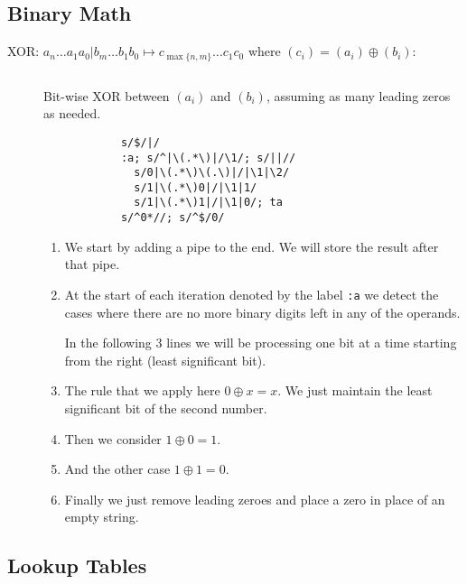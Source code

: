 \subsection{Binary Math}

\begin{description}
	\item[XOR: $a_n\ldots a_1 a_0\texttt{|}b_m\ldots b_1 b_0 \mapsto
		c_{\max\{n, m\}}\ldots c_1 c_0$ where $(c_i)=(a_i)\oplus(b_i)$:]$\,$

		Bit-wise XOR between $(a_i)$ and $(b_i)$, assuming as many leading zeros
		as needed.

		\begin{Verbatim}
			s/$/|/
			:a; s/^|\(.*\)|/\1/; s/||//
			  s/0|\(.*\)\(.\)|/|\1|\2/
			  s/1|\(.*\)0|/|\1|1/
			  s/1|\(.*\)1|/|\1|0/; ta
			s/^0*//; s/^$/0/
		\end{Verbatim}

		\begin{enumerate}
			\item We start by adding a pipe to the end.
				We will store the result after that pipe.
			\item At the start of each iteration denoted by the label \verb|:a| we
				detect the cases where there are no more binary digits left in any
				of the operands.

				In the following 3 lines we will be processing
				one bit at a time starting from the right (least significant bit).
			\item The rule that we apply here $0\oplus x = x$.  We just maintain the
				least significant bit of the second number.
			\item Then we consider $1\oplus 0=1$.
			\item And the other case $1\oplus 1=0$.
			\item Finally we just remove leading zeroes and place a zero in place of
				an empty string.
		\end{enumerate}
\end{description}



\subsection{Lookup Tables}

